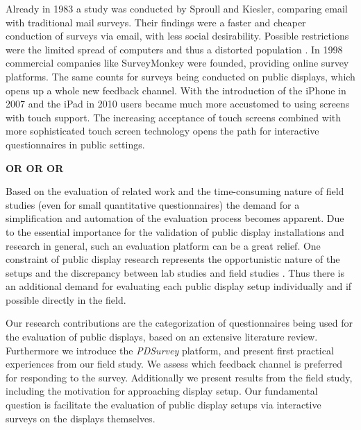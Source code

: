	Already in 1983 a study was conducted by Sproull and Kiesler, comparing email with traditional mail surveys. Their findings were a faster and cheaper conduction of surveys via email, with less social desirability. Possible restrictions were the limited spread of computers and thus a distorted population \cite{sproull1986reducing}. In 1998 commercial companies like SurveyMonkey were founded, providing online survey platforms. The same counts for surveys being conducted on public displays, which opens up a whole new feedback channel. With the introduction of the iPhone in 2007 and the iPad in 2010 users became much more accustomed to using screens with touch support. The increasing acceptance of touch screens combined with more sophisticated touch screen technology opens the path for interactive questionnaires in public settings. 

	\textbf{OR OR OR}
	
	Based on the evaluation of related work and the time-consuming nature of field studies (even for small quantitative questionnaires) the demand for a simplification and automation of the evaluation process becomes apparent. Due to the essential importance for the validation of public display installations and research in general, such an evaluation platform can be a great relief. 
	One constraint of public display research represents the opportunistic nature of the setups and the discrepancy between lab studies and field studies \cite{Ojala2011}. Thus there is an additional demand for evaluating each public display setup individually and if possible directly in the field.



	Our research contributions are the categorization of questionnaires being used for the evaluation of public displays, based on an extensive literature review. Furthermore we introduce the \textit{PDSurvey} platform, and present first practical experiences from our field study. We assess which feedback channel is preferred for responding to the survey. Additionally we present results from the field study, including the motivation for approaching display setup. Our fundamental question is facilitate the evaluation of public display setups via interactive surveys on the displays themselves.
	
